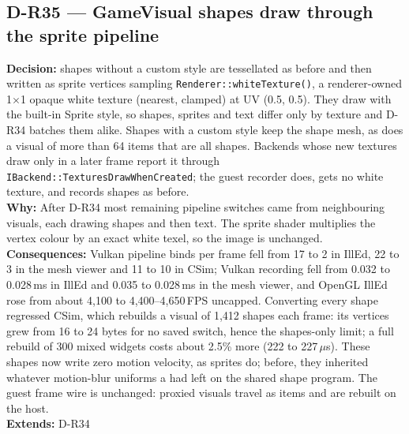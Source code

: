 \subsection*{D-R35 --- GameVisual shapes draw through the sprite pipeline}
\begin{decisionbox}[title={D-R35 \quad 2026-10-01}]
\textbf{Decision:}  shapes without a custom style are
tessellated as before and then written as sprite vertices sampling
\texttt{Renderer::whiteTexture()}, a renderer-owned 1$\times$1 opaque white
texture (nearest, clamped) at UV (0.5, 0.5). They draw with the built-in
Sprite style, so shapes, sprites and text differ only by texture and D-R34
batches them alike. Shapes with a custom style keep the shape mesh, as does a
visual of more than 64 items that are all shapes. Backends whose new textures
draw only in a later frame report it through
\texttt{IBackend::TexturesDrawWhenCreated}; the guest recorder does, gets no
white texture, and records shapes as before.\\
\textbf{Why:} After D-R34 most remaining pipeline switches came from
neighbouring visuals, each drawing shapes and then text. The sprite shader
multiplies the vertex colour by an exact white texel, so the image is
unchanged.\\
\textbf{Consequences:} Vulkan pipeline binds per frame fell from 17 to 2 in
IllEd, 22 to 3 in the mesh viewer and 11 to 10 in CSim; Vulkan recording fell
from 0.032 to 0.028\,ms in IllEd and 0.035 to 0.028\,ms in the mesh viewer,
and OpenGL IllEd rose from about 4,100 to 4,400--4,650\,FPS uncapped.
Converting every shape regressed CSim, which rebuilds a visual of 1,412 shapes
each frame: its vertices grew from 16 to 24 bytes for no saved switch, hence
the shapes-only limit; a full rebuild of 300 mixed widgets costs about
2.5\% more (222 to 227\,$\mu$s). These shapes now write zero motion velocity, as sprites
do; before, they inherited whatever motion-blur uniforms a 
had left on the shared shape program. The guest frame wire is unchanged:
proxied visuals travel as items and are rebuilt on the host.\\
\textbf{Extends:} D-R34
\end{decisionbox}

